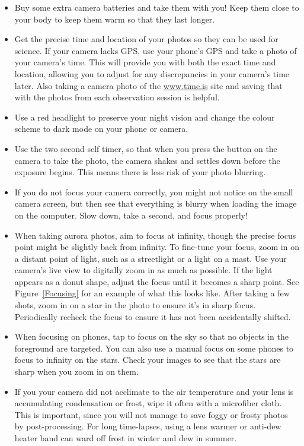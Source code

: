 \documentclass{article}
\begin{document}
\begin{itemize}
    \item Buy some extra camera batteries and take them with you! Keep them close to your body to keep them warm so that they last longer.
    \item Get the precise time and location of your photos so they can be used for science. If your camera lacks GPS, use your phone's GPS and take a photo of your camera's time. This will provide you with both the exact time and location, allowing you to adjust for any discrepancies in your camera's time later. Also taking a camera photo of the \url{www.time.is} site and saving that with the photos from each observation session is helpful.
    \item Use a red headlight to preserve your night vision and change the colour scheme to dark mode on your phone or camera.
    \item Use the two second self timer, so that when you press the button on the camera to take the photo, the camera shakes and settles down before the exposure begins. This means there is less risk of your photo blurring.
    \item If you do not focus your camera correctly, you might not notice on the small camera screen, but then see that everything is blurry when loading the image on the computer. Slow down, take a second, and focus properly! 
    \item When taking aurora photos, aim to focus at infinity, though the precise focus point might be slightly back from infinity. To fine-tune your focus, zoom in on a distant point of light, such as a streetlight or a light on a mast. Use your camera’s live view to digitally zoom in as much as possible. If the light appears as a donut shape, adjust the focus until it becomes a sharp point. See Figure~\ref{Focusing} for an example of what this looks like. After taking a few shots, zoom in on a star in the photo to ensure it’s in sharp focus. Periodically recheck the focus to ensure it has not been accidentally shifted.
    \item When focusing on phones, tap to focus on the sky so that no objects in the foreground are targeted. You can also use a manual focus on some phones to focus to infinity on the stars. Check your images to see that the stars are sharp when you zoom in on them.
    \item If you your camera did not acclimate to the air temperature and your lens is accumulating condensation or frost, wipe it often with a microfiber cloth. This is important, since you will not manage to save foggy or frosty photos by post-processing. For long time-lapses, using a lens warmer or anti-dew heater band can ward off frost in winter and dew in summer. 
    
\end{itemize}
\end{document}
